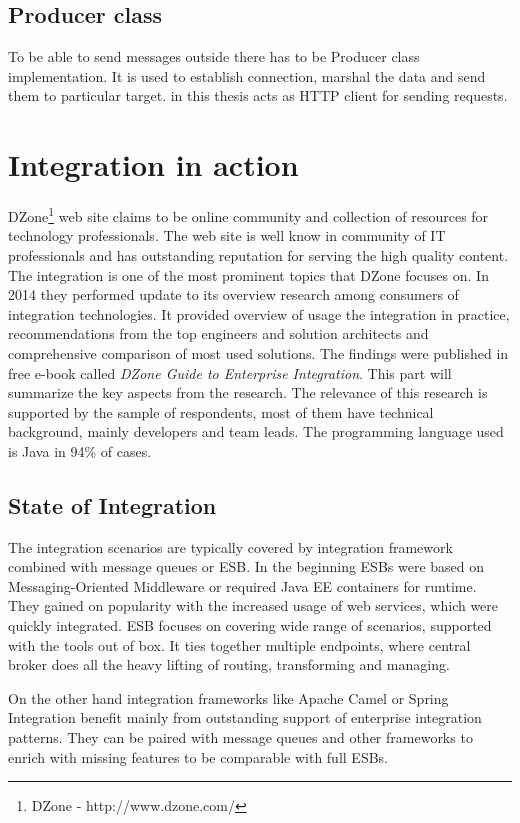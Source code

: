 \documentclass[12pt,final,oneside]{fithesis2}
\begin{document}
\subsection*{Producer class}
To be able to send messages outside there has to be Producer class implementation. It is used to establish connection, marshal the data and send them to particular target.  in this thesis acts as HTTP client for sending requests.

\section{Integration in action}
DZone\footnote{DZone - http://www.dzone.com/} web site claims to be online community and collection of resources for technology professionals. The web site is well know in community of IT professionals and has outstanding reputation for serving the high quality content. The integration is one of the most prominent topics that DZone focuses on. In 2014 they performed update to its overview research among consumers of integration technologies. It provided overview of usage the integration in practice, recommendations from the top engineers and solution architects and comprehensive comparison of most used solutions. The findings were published in free e-book called \textit{DZone Guide to Enterprise Integration}. This part will summarize the key aspects from the research.\cite{dzone} The relevance of this research is supported by the sample of respondents, most of them have technical background, mainly developers and team leads. The programming language used is Java in 94\% of cases.

\subsection*{State of Integration}
The integration scenarios are typically covered by integration framework combined with message queues or ESB.  
In the beginning ESBs were based on Messaging-Oriented Middleware or required Java EE containers for runtime. They gained on popularity with the increased usage of web services, which were quickly integrated. ESB focuses on covering wide range of scenarios, supported with the tools out of box. It ties together multiple endpoints, where central broker does all the heavy lifting of routing, transforming and managing.

On the other hand integration frameworks like Apache Camel or Spring Integration benefit mainly from outstanding support of enterprise integration patterns. They can be paired with message queues and other frameworks to enrich with missing features to be comparable with full ESBs.
\end{document}

